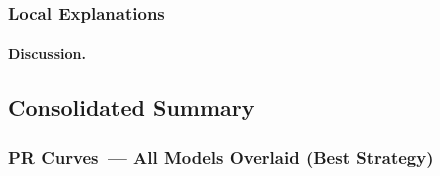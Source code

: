 \subsubsection{Local Explanations}


\paragraph{Discussion.}



\subsection{Consolidated Summary}
\label{sec:consolidated}

\subsubsection{PR Curves~--- All Models Overlaid (Best Strategy)}


